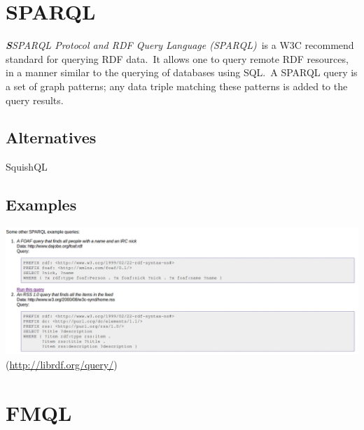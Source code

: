 \documentclass[DIV=calc, paper=a4, fontsize=12pt, onecolumn]{scrartcl}	 %
\newcommand{\initial}[1]{ %
\lettrine[lines=3,lhang=0.3,nindent=0em,slope=0em]{
\color{DarkBlue}
{\textbf{\textit{#1}}}}{}}
\begin{document}

\section[SPARQL Protocol and RDF Query Language (SPARQL)]{SPARQL}
  \label{sec:sparql}

\initial{S}\textit{SPARQL Protocol and RDF Query Language (SPARQL)}\
		is a W3C recommend standard for querying RDF data.\
		It allows one to query remote RDF resources, in a manner similar to the querying of databases using SQL.\
		A SPARQL query is a set of graph patterns; any data triple matching these patterns is added to the query results.\
                   \cite{Jarrar_mashql:_2008}     
		
		\subsection{Alternatives}
		SquishQL

		\subsection{Examples}

                   \includegraphics[scale=0.3]{sparql.png}\\
                   (\url{http://librdf.org/query/})\
                     


\section[FileMan Query Language (FMQL)]{FMQL}
  \label{sec:fmql}
\end{document}
